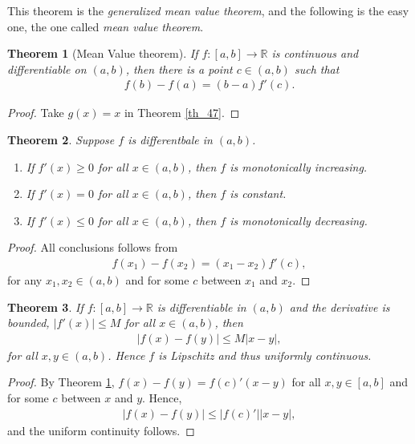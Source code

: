 \documentclass[10pt]{book}
\newtheorem{theorem}{Theorem}[chapter]
\theoremstyle{definition}
\numberwithin{equation}{chapter}
\begin{document}
\medskip

This theorem is the {\em generalized mean value theorem}, and the following is the easy one, the one called {\em mean value theorem}.

\medskip

\begin{theorem}[Mean Value theorem]\label{th_48}
If $f: [a,b] \to \mathbb{R}$ is continuous and differentiable on $(a,b)$, then there is a point $c \in (a,b)$ such that
\begin{align*}
    f(b) - f(a) = (b - a) f'(c).
\end{align*}
\end{theorem}
\begin{proof}
Take $g(x) = x$ in Theorem \ref{th_47}.
\end{proof}

\medskip

\begin{theorem}
Suppose $f$ is differentbale in $(a,b)$.
\begin{enumerate}[label=(\alph*)]
    \item If $f'(x) \geq 0$ for all $x \in (a,b)$, then $f$ is monotonically increasing.
    
    \item If $f'(x) = 0$ for all $x \in (a,b)$, then $f$ is constant.
    
    \item If $f'(x) \leq 0$ for all $x \in (a,b)$, then $f$ is monotonically decreasing.
\end{enumerate}
\end{theorem}
\begin{proof}
All conclusions follows from
\begin{align*}
    f(x_1) - f(x_2) = (x_1 - x_2) f'(c),
\end{align*}
for any $x_1, x_2 \in (a,b)$ and for some $c$ between $x_1$ and $x_2$.
\end{proof}

\medskip

\begin{theorem}
If $f: [a,b] \to \mathbb{R}$ is differentiable in $(a,b)$ and the derivative is bounded, $\left|f'(x)\right| \leq M$ for all $x \in (a,b)$, then 
\begin{align*}
    \left|f(x) - f(y)\right| \leq M \left|x - y\right|,
\end{align*}
for all $x,y \in (a,b)$. Hence $f$ is Lipschitz and thus uniformly continuous.
\end{theorem}
\begin{proof}
By Theorem \ref{th_48}, $f(x) - f(y) = f(c)'(x - y)$ for all $x,y \in [a,b]$ and for some $c$ between $x$ and $y$. Hence,
\begin{align*}
    \left|f(x) - f(y)\right| \leq \left|f(c)'\right| \left|x - y\right|,
\end{align*}
and the uniform continuity follows.
\end{proof}
\end{document}
